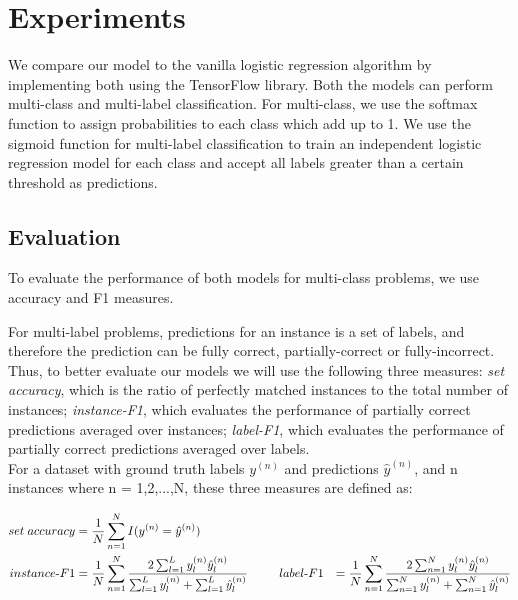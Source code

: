 \section{Experiments}


We compare our model to the vanilla logistic regression algorithm by implementing both using the TensorFlow library. Both the models can perform multi-class and multi-label classification. For multi-class, we use the softmax function to assign probabilities to each class which add up to 1. We use the sigmoid function for multi-label classification to train an independent logistic regression model for each class and accept all labels greater than a certain threshold as predictions.

\subsection{Evaluation}

To evaluate the performance of both models for multi-class problems, we use accuracy and F1 measures.

For multi-label problems, predictions for an instance is a set of labels, and therefore the prediction can be fully correct, partially-correct or fully-incorrect. Thus, to better evaluate our models we will use the following three measures: \textit{set accuracy}, which is the ratio of perfectly matched instances to the total number of instances; \textit{instance-F1}, which evaluates the performance of partially correct predictions averaged over instances; \textit{label-F1}, which evaluates the performance of partially correct predictions averaged over labels.\\

For a dataset with ground truth labels $y^{(n)}$ and predictions $\hat{y}^{(n)}$, and n instances where n = 1,2,...,N, these three measures are defined as:

\begin{alignat}{2}
set\; accuracy & = \frac{1}{N} \sum_{n=1}^{N} {I(y^{(n)} = \hat{y}^{(n)})}\\
instance \mbox{-} F1 & = \frac{1}{N} \sum_{n=1}^{N} \frac{2\sum_{l=1}^{L} {y^{(n)}_{l} \hat{y}^{(n)}_{l}}}{\sum_{l=1}^{L} {y^{(n)}_{l}} + \sum_{l=1}^{L} {\hat{y}^{(n)}_{l}}}
\hspace{6ex}
label \mbox{-} F1 & = \frac{1}{N} \sum_{n=1}^{N} \frac{2\sum_{n=1}^{N} {y^{(n)}_{l} \hat{y}^{(n)}_{l}}}{\sum_{n=1}^{N} {y^{(n)}_{l}} + \sum_{n=1}^{N} {\hat{y}^{(n)}_{l}}}
\end{alignat}

